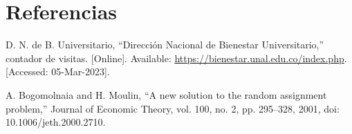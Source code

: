 \documentclass{article}
\begin{document}
\section{Referencias}
\renewcommand{\refname}{}
\begin{thebibliography}{9}

 \label{ref:bienUniv}D. N. de B. Universitario, “Dirección Nacional de Bienestar Universitario,” contador de visitas. [Online]. Available: \href{https://bienestar.unal.edu.co/index.php}{https://bienestar.unal.edu.co/index.php}. [Accessed: 05-Mar-2023].  

 \label{ref:PBS} A. Bogomolnaia and H. Moulin, “A new solution to the random 
assignment problem,” Journal of Economic Theory, vol. 100, no. 2, pp. 295–328, 2001, doi: 
10.1006/jeth.2000.2710.



\end{thebibliography}
\end{document}
